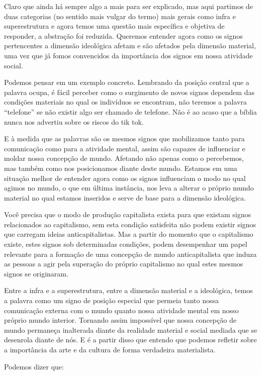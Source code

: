 Claro que ainda há sempre algo a mais para ser explicado, mas aqui partimos de duas categorias (no sentido mais vulgar do termo) mais gerais como infra e superestrutura e agora temos uma questão mais específica e objetiva de responder, a abstração foi reduzida. Queremos entender agora como os signos pertencentes a dimensão ideológica afetam e são afetados pela dimensão material, uma vez que já fomos convencidos da importância dos signos em nossa atividade social.

Podemos pensar em um exemplo concreto. Lembrando da posição central que a palavra ocupa, é fácil perceber como o surgimento de novos signos dependem das condições materiais no qual os indivíduos se encontram, não teremos a palavra “telefone” se não existir algo ser chamado de telefone. Não é ao acaso que a bíblia nunca nos advertiu sobre os riscos do tik tok.

E à medida que as palavras são os mesmos signos que mobilizamos tanto para comunicação como para a atividade mental, assim são capazes de influenciar e moldar nossa concepção de mundo. Afetando não apenas como o percebemos, mas também como nos posicionamos diante deste mundo. Estamos em uma situação melhor de entender agora como os signos influenciam o modo no qual agimos no mundo, o que em última instância, nos leva a alterar o próprio mundo material no qual estamos inseridos e serve de base para a dimensão ideológica.

Você precisa que o modo de produção capitalista exista para que existam signos relacionados ao capitalismo, sem esta condição satisfeita não podem existir signos que carregam ideias anticapitalistas. Mas a partir do momento que o capitalismo existe, estes signos sob determinadas condições, podem desempenhar um papel relevante para a formação de uma concepção de mundo anticapitalista que induza as pessoas a agir pela superação do próprio capitalismo no qual estes mesmos signos se originaram.

Entre a infra e a superestrutura, entre a dimensão material e a ideológica, temos a palavra como um signo de posição especial que permeia tanto nossa comunicação externa com o mundo quanto nossa atividade mental em nosso próprio mundo interior. Tornando assim impossível que nossa concepção de mundo permaneça inalterada diante da realidade material e social mediada que se desenrola diante de nós. E é a partir disso que entendo que podemos refletir sobre a importância da arte e da cultura de forma verdadeira materialista.

Podemos dizer que:

